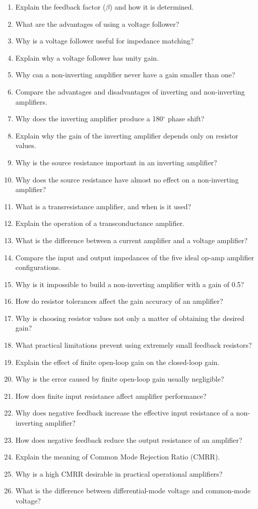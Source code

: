 \documentclass[../main.tex]{subfiles}
\begin{document}
\begin{enumerate}[label=\textbf{\arabic*.}]
	\item Explain the feedback factor ($\beta$) and how it is determined.
	\item What are the advantages of using a voltage follower?
	\item Why is a voltage follower useful for impedance matching?
	\item Explain why a voltage follower has unity gain.
	\item Why can a non-inverting amplifier never have a gain smaller than one?
	\item Compare the advantages and disadvantages of inverting and non-inverting amplifiers.
	\item Why does the inverting amplifier produce a 180$^\circ$ phase shift?
	\item Explain why the gain of the inverting amplifier depends only on resistor values.
	\item Why is the source resistance important in an inverting amplifier?
	\item Why does the source resistance have almost no effect on a non-inverting amplifier?
	\item What is a transresistance amplifier, and when is it used?
	\item Explain the operation of a transconductance amplifier.
	\item What is the difference between a current amplifier and a voltage amplifier?
	\item Compare the input and output impedances of the five ideal op-amp amplifier configurations.
	\item Why is it impossible to build a non-inverting amplifier with a gain of 0.5?
	\item How do resistor tolerances affect the gain accuracy of an amplifier?
	\item Why is choosing resistor values not only a matter of obtaining the desired gain?
	\item What practical limitations prevent using extremely small feedback resistors?
	\item Explain the effect of finite open-loop gain on the closed-loop gain.
	\item Why is the error caused by finite open-loop gain usually negligible?
	\item How does finite input resistance affect amplifier performance?
	\item Why does negative feedback increase the effective input resistance of a non-inverting amplifier?
	\item How does negative feedback reduce the output resistance of an amplifier?
	\item Explain the meaning of Common Mode Rejection Ratio (CMRR).
	\item Why is a high CMRR desirable in practical operational amplifiers?
	\item What is the difference between differential-mode voltage and common-mode voltage?

\end{enumerate}
\end{document}
